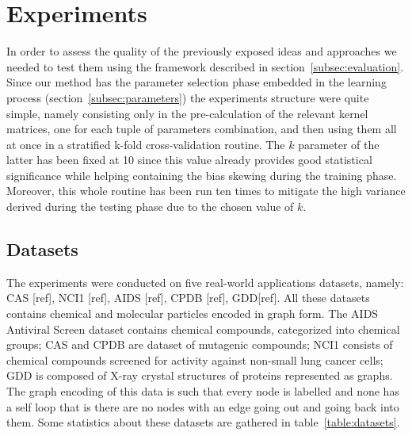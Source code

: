 
\chapter{Experiments}
\label{Chapter4}

In order to assess the quality of the previously exposed ideas and approaches we
needed to test them using the framework described in section~\ref{subsec:evaluation}. 
Since our method has the parameter selection phase embedded in the learning
process (section~\ref{subsec:parameters}) the experiments structure were quite
simple, namely consisting only in the pre-calculation of the relevant kernel
matrices, one for each tuple of parameters combination, and then using them all
at once in a stratified k-fold cross-validation routine.
The $k$ parameter of the latter has been fixed at 10 since this value already
provides good statistical significance while helping containing the bias
skewing during the training phase.
Moreover, this whole routine has been run ten times to mitigate the high
variance derived during the testing phase due to the chosen value of $k$.

\section{Datasets}
\label{subsec:datasets}

The experiments were conducted on five real-world applications datasets, namely:
CAS [ref], NCI1 [ref], AIDS [ref], CPDB [ref], GDD[ref]. All these datasets
contains chemical and molecular particles encoded in graph form.
The AIDS Antiviral Screen dataset contains chemical compounds, categorized
into chemical groups; CAS and CPDB are dataset of mutagenic
compounds; NCI1 consists of chemical compounds screened for activity against 
non-small lung cancer cells; GDD is composed of X-ray crystal structures of
proteins represented as graphs.
The graph encoding of this data is such that every node is labelled and none
has a self loop that is there are no nodes with an edge going out and going back
into them.
Some statistics about these datasets are gathered in table~\ref{table:datasets}.

